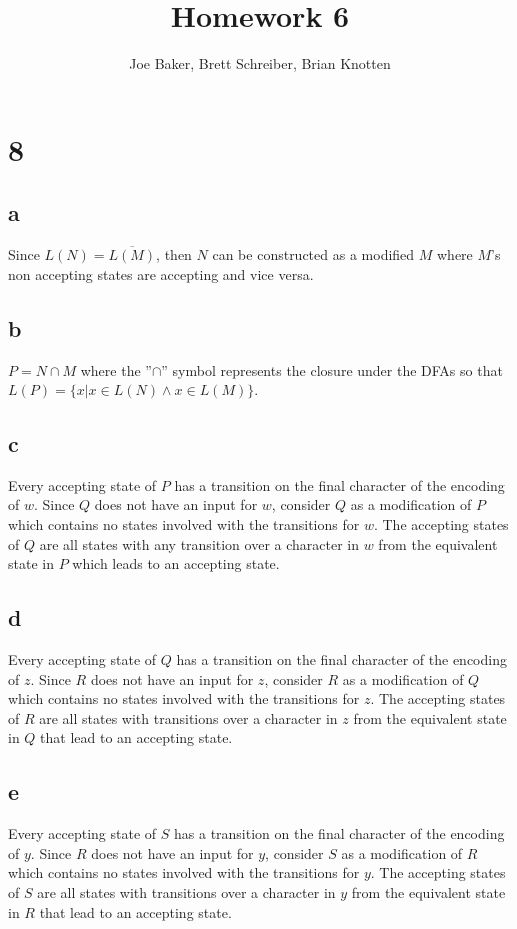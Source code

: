 \documentclass[letterpaper,notitlepage,twoside]{article}
\begin{document}
\title{Homework 6}
\author{Joe Baker, Brett Schreiber, Brian Knotten}
\maketitle

\section*{8}

\subsection*{a}
Since $L(N) = \overline  {L(M)}$, then $N$ can be constructed as a modified $M$ where $M$'s non accepting states are accepting and vice versa.
\subsection*{b}
$P = N \cap M$ where the ''$\cap$'' symbol represents the closure under the DFAs so that $L(P) = \{x | x \in L(N) \land x \in L(M)\}$.
\subsection*{c}
Every accepting state of $P$ has a transition on the final character of the encoding of $w$. Since $Q$ does not have an input for $w$, consider $Q$ as a modification of $P$ which contains no states involved with the transitions for $w$. The accepting states of $Q$ are all states with any transition over a character in $w$ from the equivalent state in $P$ which leads to an accepting state.

\subsection*{d}
Every accepting state of $Q$ has a transition on the final character of the encoding of $z$. Since $R$ does not have an input for $z$, consider $R$ as a modification of $Q$ which contains no states involved with the transitions for $z$. The accepting states of $R$ are all states with transitions over a character in $z$ from the equivalent state in $Q$ that lead to an accepting state.

\subsection*{e}
Every accepting state of $S$ has a transition on the final character of the encoding of $y$. Since $R$ does not have an input for $y$, consider $S$ as a modification of $R$ which contains no states involved with the transitions for $y$. The accepting states of $S$ are all states with transitions over a character in $y$ from the equivalent state in $R$ that lead to an accepting state.
\end{document}
